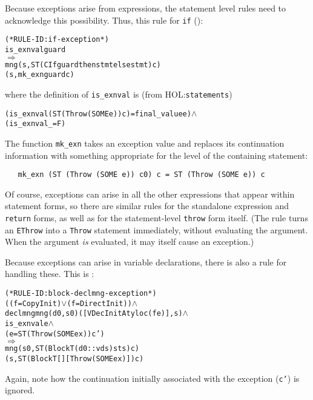 \documentclass[11pt]{article}
\newcommand{\HOLfile}[1]{HOL:\texttt{#1}}
\begin{document}
\medskip
Because exceptions arise from expressions, the statement level rules
need to acknowledge this possibility.  Thus, this rule for
\texttt{if} ():
\begin{center}
\begin{minipage}{\textwidth}
%
%
\begin{alltt}
(* RULE-ID: if-exception *)
     is_exnval guard
   \(\Rightarrow\)
     mng (s, ST (CIf guard thenstmt elsestmt) c)
         (s, mk_exn guard c)
\end{alltt}
\end{minipage}
\end{center}
where the definition of \texttt{is_exnval} is (from
\HOLfile{statements})
\begin{alltt}
   (is_exnval (ST (Throw (SOME e)) c) = final_value e) \(\land\)
   (is_exnval _ = F)
\end{alltt}
The function \texttt{mk_exn} takes an exception value and
replaces its continuation information with something appropriate for
the level of the containing statement: 
\begin{verbatim}
   mk_exn (ST (Throw (SOME e)) c0) c = ST (Throw (SOME e)) c
\end{verbatim}

Of course, exceptions can arise in all the other expressions that
appear within statement forms, so there are similar rules for the
standalone expression and \texttt{return} forms, as well as for the
statement-level \texttt{throw} form itself.  (The rule
 turns an \texttt{EThrow} into a
\texttt{Throw} statement immediately, without evaluating the argument.
When the argument \emph{is} evaluated, it may itself cause an
exception.)

Because exceptions can arise in variable declarations, there is also a
rule for handling these.  This is :
\begin{center}
\begin{minipage}{\textwidth}
%
\begin{alltt}
(* RULE-ID: block-declmng-exception *)
     ((f = CopyInit) \(\lor\) (f = DirectInit)) \(\land\)
     declmng mng (d0, s0) ([VDecInitA ty loc (f e)], s) \(\land\)
     is_exnval e \(\land\)
     (e = ST (Throw (SOME ex)) c')
   \(\Rightarrow\)
     mng (s0, ST (Block T (d0 :: vds) sts) c)
         (s, ST (Block T [] [Throw (SOME ex)]) c)
\end{alltt}
\end{minipage}
\end{center}
Again, note how the continuation initially associated with the
exception (\texttt{c'}) is ignored.
\end{document}
